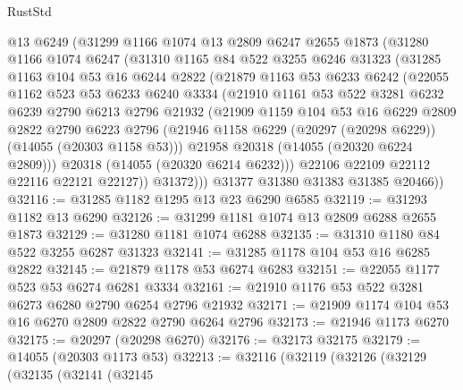 \begin{lexlean}{RustStd}
\begin{coremodule}
      @13
      @6249
      (@31299
        @1166
        @1074
        @13
        @2809
        @6247
        @2655
        @1873
        (@31280
          @1166
          @1074
          @6247
          (@31310
            @1165
            @84
            @522
            @3255
            @6246
            @31323
            (@31285
              @1163
              @104
              @53
              @16
              @6244
              @2822
              (@21879
                @1163
                @53
                @6233
                @6242
                (@22055
                  @1162
                  @523
                  @53
                  @6233
                  @6240
                  @3334
                  (@21910
                    @1161
                    @53
                    @522
                    @3281
                    @6232
                    @6239
                    @2790
                    @6213
                    @2796
                    @21932
                    (@21909
                      @1159
                      @104
                      @53
                      @16
                      @6229
                      @2809
                      @2822
                      @2790
                      @6223
                      @2796
                      (@21946 @1158 @6229 (@20297 (@20298 @6229)) (@14055 (@20303 @1158 @53)))
                      @21958
                      @20318
                      (@14055 (@20320 @6224 @2809)))
                    @20318
                    (@14055 (@20320 @6214 @6232)))
                  @22106
                  @22109
                  @22112
                  @22116
                  @22121
                  @22127))
              @31372)))
        @31377
        @31380
        @31383
        @31385
        @20466))
@32116 := @31285 @1182 @1295 @13 @23 @6290 @6585
@32119 := @31293 @1182 @13 @6290
@32126 := @31299 @1181 @1074 @13 @2809 @6288 @2655 @1873
@32129 := @31280 @1181 @1074 @6288
@32135 := @31310 @1180 @84 @522 @3255 @6287 @31323
@32141 := @31285 @1178 @104 @53 @16 @6285 @2822
@32145 := @21879 @1178 @53 @6274 @6283
@32151 := @22055 @1177 @523 @53 @6274 @6281 @3334
@32161 := @21910 @1176 @53 @522 @3281 @6273 @6280 @2790 @6254 @2796 @21932
@32171 := @21909 @1174 @104 @53 @16 @6270 @2809 @2822 @2790 @6264 @2796
@32173 := @21946 @1173 @6270
@32175 := @20297 (@20298 @6270)
@32176 := @32173 @32175
@32179 := @14055 (@20303 @1173 @53)
@32213 := @32116
    (@32119
      (@32126
        (@32129
          (@32135
            (@32141
              (@32145

\end{coremodule}
\end{lexlean}
